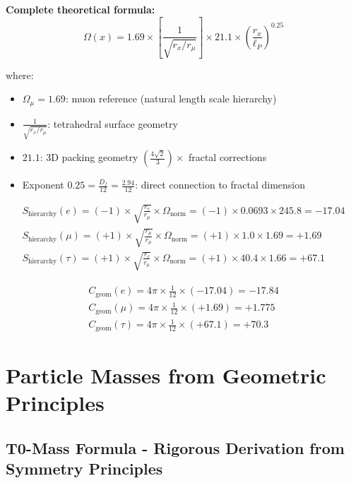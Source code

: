 \documentclass[12pt,a4paper]{article}
\numberwithin{equation}{section}
\newcommand{\Cgeom}{C_{\text{geom}}}
\newcommand{\Df}{D_f}
\newcommand{\lP}{\ell_P}
\newcommand{\Omegafactor}{\Omega}
\begin{document}
	\textbf{Complete theoretical formula:}
	\begin{equation}
		\Omegafactor(x) = 1.69 \times \left[\frac{1}{\sqrt{r_x/r_\mu}}\right] \times 21.1 \times \left(\frac{r_x}{\lP}\right)^{0.25}
		\label{eq:omega_complete}
	\end{equation}
	
	where:
	\begin{itemize}
		\item $\Omega_\mu = 1.69$: muon reference (natural length scale hierarchy)
		\item $\frac{1}{\sqrt{r_x/r_\mu}}$: tetrahedral surface geometry
		\item $21.1$: 3D packing geometry $\left(\frac{4\sqrt{2}}{3}\right) \times$ fractal corrections
		\item Exponent $0.25 = \frac{\Df}{12} = \frac{2.94}{12}$: direct connection to fractal dimension
	\end{itemize}
	
	\begin{align}
		S_{\text{hierarchy}}(e) = (-1) \times \sqrt{\frac{r_e}{r_\mu}} \times \Omegafactor_{\text{norm}} = (-1) \times 0.0693 \times 245.8 = -17.04\\
		S_{\text{hierarchy}}(\mu) = (+1) \times \sqrt{\frac{r_\mu}{r_\mu}} \times \Omegafactor_{\text{norm}} = (+1) \times 1.0 \times 1.69 = +1.69\\
		S_{\text{hierarchy}}(\tau) = (+1) \times \sqrt{\frac{r_\tau}{r_\mu}} \times \Omegafactor_{\text{norm}} = (+1) \times 40.4 \times 1.66 = +67.1
		\label{eq:signature_factors}
	\end{align}
	
	\begin{align}
		\Cgeom(e) = 4\pi \times \frac{1}{12} \times (-17.04) = -17.84\\
		\Cgeom(\mu) = 4\pi \times \frac{1}{12} \times (+1.69) = +1.775\\
		\Cgeom(\tau) = 4\pi \times \frac{1}{12} \times (+67.1) = +70.3
		\label{eq:cgeom_values}
	\end{align}
	
	\section{Particle Masses from Geometric Principles}
	
	\subsection{T0-Mass Formula - Rigorous Derivation from Symmetry Principles}
	
\end{document}
